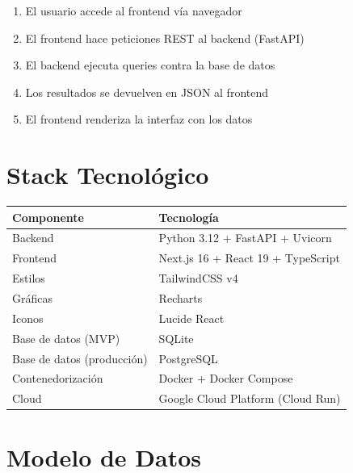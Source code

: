 \documentclass[11pt,a4paper]{article}
\begin{document}
\begin{enumerate}[noitemsep]
    \item El usuario accede al frontend vía navegador
    \item El frontend hace peticiones REST al backend (FastAPI)
    \item El backend ejecuta queries contra la base de datos
    \item Los resultados se devuelven en JSON al frontend
    \item El frontend renderiza la interfaz con los datos
\end{enumerate}

\section{Stack Tecnológico}

\begin{center}
\begin{tabular}{ll}
\toprule
\textbf{Componente} & \textbf{Tecnología} \\
\midrule
Backend & Python 3.12 + FastAPI + Uvicorn \\
Frontend & Next.js 16 + React 19 + TypeScript \\
Estilos & TailwindCSS v4 \\
Gráficas & Recharts \\
Iconos & Lucide React \\
Base de datos (MVP) & SQLite \\
Base de datos (producción) & PostgreSQL \\
Contenedorización & Docker + Docker Compose \\
Cloud & Google Cloud Platform (Cloud Run) \\
\bottomrule
\end{tabular}
\end{center}

\section{Modelo de Datos}
\end{document}
